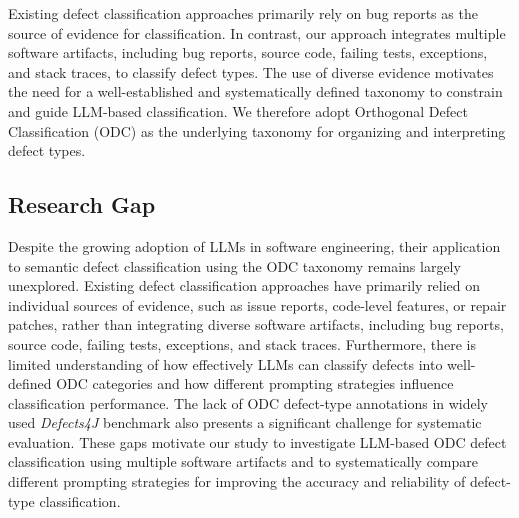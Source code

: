 Existing defect classification approaches primarily rely on bug reports as the source of evidence for classification. In contrast, our approach integrates multiple software artifacts, including bug reports, source code, failing tests, exceptions, and stack traces, to classify defect types. The use of diverse evidence motivates the need for a well-established and systematically defined taxonomy to constrain and guide LLM-based classification. We therefore adopt Orthogonal Defect Classification (ODC) as the underlying taxonomy for organizing and interpreting defect types.


\subsection{Research Gap}
Despite the growing adoption of LLMs in software engineering, their application to semantic defect classification using the ODC taxonomy remains largely unexplored. Existing defect classification approaches have primarily relied on individual sources of evidence, such as issue reports, code-level features, or repair patches, rather than integrating diverse software artifacts, including bug reports, source code, failing tests, exceptions, and stack traces. Furthermore, there is limited understanding of how effectively LLMs can classify defects into well-defined ODC categories and how different prompting strategies influence classification performance. The lack of ODC defect-type annotations in widely used \textit{Defects4J} benchmark also presents a significant challenge for systematic evaluation. These gaps motivate our study to investigate LLM-based ODC defect classification using multiple software artifacts and to systematically compare different prompting strategies for improving the accuracy and reliability of defect-type classification.

